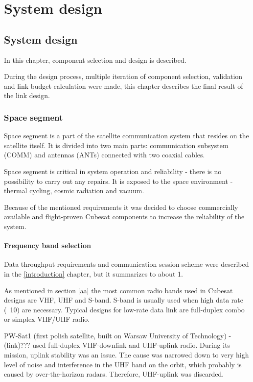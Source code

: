 \part{System design}
\chapter{System design}

In this chapter, component selection and design is described.

During the design process, multiple iteration of component selection, validation and link budget calculation were made, this chapter describes the final result of the link design. 

\section{Space segment}
Space segment is a part of the satellite communication system that resides on the satellite itself. It is divided into two main parts: communication subsystem (COMM) and antennas (ANTs) connected with two coaxial cables.

Space segment is critical in system operation and reliability - there is no possibility to carry out any repairs. It is exposed to the space environment - thermal cycling, cosmic radiation and vacuum.

Because of the mentioned requirements it was decided to choose commercially available and flight-proven Cubesat components to increase the reliability of the system.

\subsection{Frequency band selection}
Data throughput requirements and communication session scheme were described in the \ref{introduction} chapter, but it summarizes to about \SI{1}{\kbps}.

As mentioned in section \ref{aa} the most common radio bands used in Cubesat designs are VHF, UHF and S-band. S-band is usually used when high data rate (~\SI{10}{\Mbps}) are necessary. Typical designs for low-rate data link are full-duplex combo or simplex VHF/UHF radio.

PW-Sat1 (first polish satellite, built on Warsaw University of Technology) - (link)??? used full-duplex VHF-downlink and UHF-uplink radio. During its mission, uplink stability was an issue. The cause was narrowed down to very high level of noise and interference in the UHF band on the orbit, which probably is caused by over-the-horizon radars. Therefore, UHF-uplink was discarded.

